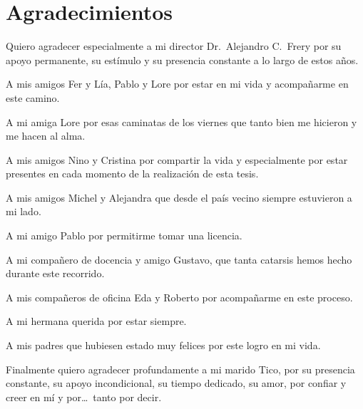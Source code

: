 
\chapter*{Agradecimientos}

Quiero agradecer especialmente a mi director Dr.\ Alejandro C.\ Frery por su apoyo permanente, su estímulo y su presencia constante a lo largo de estos años. 

A mis amigos Fer y Lía, Pablo y Lore por estar en mi vida y acompañarme en este camino.

A mi amiga Lore por esas caminatas de los viernes que tanto bien me hicieron y me hacen al alma.

A mis amigos Nino y Cristina por compartir la vida y especialmente por estar presentes en cada momento de la realización de esta tesis.

A mis amigos Michel y Alejandra que desde el país vecino siempre estuvieron a mi lado.

A mi amigo Pablo por permitirme tomar una licencia.

A mi compañero de docencia y amigo Gustavo, que tanta catarsis hemos hecho durante este recorrido.

A mis compañeros de oficina Eda y Roberto por acompañarme en este proceso. 

A mi hermana querida por estar siempre.

A mis padres que hubiesen estado muy felices por este logro en mi vida.

Finalmente quiero agradecer profundamente a mi marido Tico, por su presencia constante, su apoyo incondicional, su tiempo dedicado, su amor, por confiar y creer en mí y por\dots\ tanto por decir.
